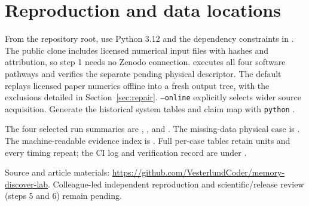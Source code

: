 \documentclass[10pt,a4paper]{article}
\newcommand{\code}[1]{\texttt{#1}}
\begin{document}
\section{Reproduction and data locations}
From the repository root, use Python 3.12 and the dependency constraints in . The public clone includes licensed numerical input files with hashes and attribution, so step 1 needs no Zenodo connection.  executes all four software pathways and verifies the separate pending physical descriptor. The default  replays licensed paper numerics offline into a fresh output tree, with the exclusions detailed in Section~\ref{sec:repair}. \code{--online} explicitly selects wider source acquisition. Generate the historical system tables and claim map with \code{python} .

{\raggedright The four selected run summaries are , ,  and . The missing-data physical case is . The machine-readable evidence index is . Full per-case tables retain units and every timing repeat; the CI log and verification record are under .\par}

Source and article materials: \url{https://github.com/VesterlundCoder/memory-discover-lab}. Colleague-led independent reproduction and scientific/release review (steps 5 and 6) remain pending.
\clearpage

\end{document}
